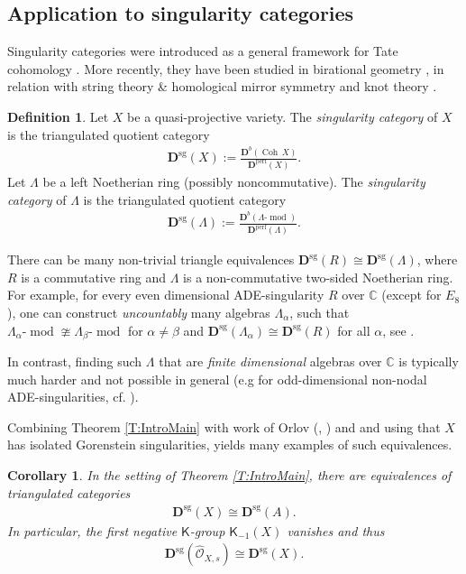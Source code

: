 \documentclass[a4paper,11pt, reqno]{amsart}
\def\C{\mathbb C}
\def\DD{\mathbf D}
\def\Coh{{\operatorname{Coh}}}
\def\mod{{\operatorname{mod}}}
\def\Dsg{\DD^{\mathrm{sg}}}
\def\Db{\DD^b}
\def\Dperf{\DD^{\mathrm{perf}}}
\newcommand{\bK}{\mathsf{K}}
\theoremstyle{plain}
\newtheorem{corollary}[dummy]{Corollary}
\theoremstyle{definition}
\newtheorem{definition}[dummy]{Definition}
\numberwithin{equation}{section}
\begin{document}
\subsection{Application to  singularity categories}
Singularity categories were introduced  as a general framework for Tate cohomology \cite{Buchweitz}. More recently, they have been studied in birational geometry \cite{Wemyss18}, in relation with string theory \& homological mirror symmetry \cite{orlov-sing-1} and knot theory \cite{KR}.


\begin{definition}
    Let $X$ be a quasi-projective variety. The \emph{singularity category} of $X$ is the triangulated quotient category
    \begin{align}
        \Dsg(X):=\frac{\Db(\Coh \, X)}{\Dperf(X)}. 
    \end{align}
    Let $\Lambda$ be a left Noetherian ring (possibly noncommutative). The \emph{singularity category} of $\Lambda$ is the triangulated quotient category
    \begin{align}
        \Dsg(\Lambda):=\frac{\Db(\Lambda\mbox{-}\mod)}{\Dperf(\Lambda)}. 
    \end{align}
\end{definition}

There can be many non-trivial triangle equivalences $\Dsg(R) \cong \Dsg(\Lambda)$, where $R$ is a commutative ring  and $\Lambda$ is a non-commutative two-sided Noetherian ring.  For example, for every even dimensional ADE-singularity $R$ over $\C$ (except for $E_8$), one can construct \emph{uncountably} many algebras $\Lambda_\alpha$, such that
$\Lambda_\alpha\mbox{-}\mod \ncong \Lambda_\beta\mbox{-}\mod$ for $\alpha \neq \beta$ and $\Dsg(\Lambda_\alpha) \cong \Dsg(R)$ for all $\alpha$, see \cite{KIWY15}. 

In contrast, finding such $\Lambda$ that are \emph{finite dimensional} algebras over $\mathbb{C}$ is typically much harder and not possible in general (e.g for odd-dimensional non-nodal ADE-singularities, cf. \cite{kalck-klapproth-pavic}). 

Combining Theorem \ref{T:IntroMain}
with work of Orlov (\cite[Prop. 1.10]{orlov-hf}, \cite{OrlovIdemp}) and \cite[Corollary 4.5]{KPS} and using that $X$ has isolated Gorenstein singularities, yields many examples of such equivalences.

\begin{corollary}\label{C:Singulareq}
    In the setting of Theorem \ref{T:IntroMain}, there are equivalences of triangulated categories
    \begin{align}
         \Dsg(X) \cong \Dsg(A).
    \end{align}
In particular, the first negative $\bK$-group $\bK_{-1}(X)$ vanishes and thus
    \begin{align}\label{eq:singeqcompllocal}
    \Dsg\left(\widehat{\mathcal{O}}_{X, s}\right) \cong \Dsg(X).
    \end{align}
\end{corollary}
\end{document}
